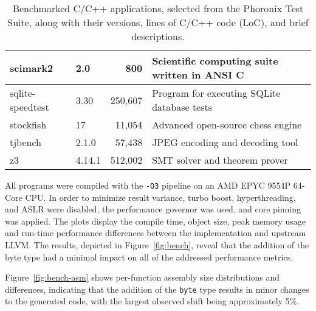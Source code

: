 \documentclass[a4paper,12pt]{article}
\begin{document}
\begin{table}[t]
\begin{tabular}{|l|l|r|l|}
    \hline
    scimark2           & 2.0              & 800          & Scientific computing suite written in ANSI C                \\
    \hline
    sqlite-speedtest   & 3.30             & 250,607       & Program for executing SQLite database tests           \\
    \hline
    stockfish          & 17               & 11,054        & Advanced open-source chess engine                           \\
    \hline
    tjbench            & 2.1.0            & 57,438        & JPEG encoding and decoding tool           \\
    \hline
    z3                 & 4.14.1           & 512,002       & SMT solver and theorem prover  \\
    \hline
  \end{tabular}
  \caption{Benchmarked C/C++ applications, selected from the Phoronix Test Suite, along with their versions, lines of C/C++ code (LoC), and brief descriptions.}
  \label{tab:bench}
\end{table}

All programs were compiled with the \texttt{-O3} pipeline on an AMD EPYC 9554P 64-Core CPU.
In order to minimize result variance, turbo boost, hyperthreading, and ASLR were disabled, the performance governor was used, and core pinning was applied.
The plots display the compile time, object size, peak memory usage and run-time performance differences between the implementation and upstream LLVM.
The results, depicted in Figure~\ref{fig:bench}, reveal that the addition of the byte type had a minimal impact on all of the addressed performance metrics.

Figure~\ref{fig:bench-asm} shows per-function assembly size distributions and differences, indicating that the addition of the \texttt{byte} type results in minor changes to the generated code, with the largest observed shift being approximately 5\%.

\clearpage
\end{document}
